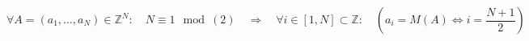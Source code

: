 \documentclass{article}
\begin{document}
\begin{equation}
    \forall A = (a_1,\ldots,a_N) \in \mathbb{Z}^N:
\quad
N \equiv 1 \mod(2)
\quad\Rightarrow\quad
\forall i \in [1,N] \subset \mathbb{Z}:
\quad
\left(
a_i = M(A) \Leftrightarrow i = \frac{N+1}{2}
\right)
\end{equation}
\end{document}
